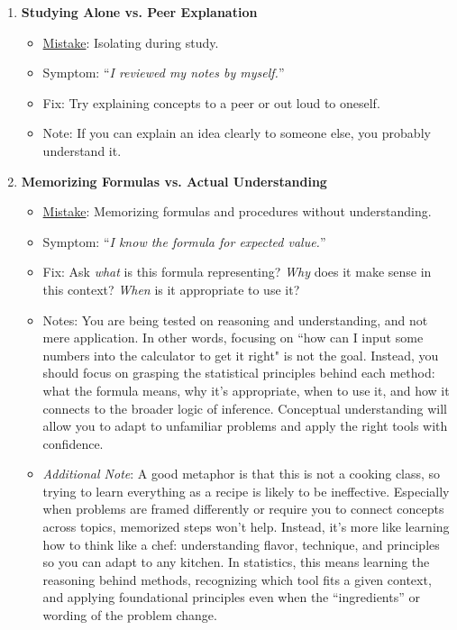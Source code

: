 \documentclass[12pt]{article}
\begin{document}
\begin{enumerate}
\item \textbf{Studying Alone vs. Peer Explanation}
\begin{itemize}
    \item \underline{Mistake}: Isolating during study.
    \item Symptom: ``\emph{I reviewed my notes by myself.}''
    \item Fix: Try explaining concepts to a peer or out loud to oneself.
    \item Note: If you can explain an idea clearly to someone else, you probably understand it.
\end{itemize}

\item \textbf{Memorizing Formulas vs. Actual Understanding}
\begin{itemize}
    \item \underline{Mistake}: Memorizing formulas and procedures without understanding.
    \item Symptom: ``\emph{I know the formula for expected value.}''
    \item Fix: Ask \emph{what} is this formula representing? \emph{Why} does it make sense in this context? \emph{When} is it appropriate to use it?
    \item Notes: You are being tested on reasoning and understanding, and not mere application. In other words, focusing on ``how can I input some numbers into the calculator to get it right" is not the goal. Instead, you should focus on grasping the statistical principles behind each method: what the formula means, why it’s appropriate, when to use it, and how it connects to the broader logic of inference. Conceptual understanding will allow you to adapt to unfamiliar problems and apply the right tools with confidence.
    \item \emph{Additional Note}: A good metaphor is that this is not a cooking class, so trying to learn everything as a recipe is likely to be ineffective. Especially when problems are framed differently or require you to connect concepts across topics, memorized steps won’t help. Instead, it's more like learning how to think like a chef: understanding flavor, technique, and principles so you can adapt to any kitchen. In statistics, this means learning the reasoning behind methods, recognizing which tool fits a given context, and applying foundational principles even when the ``ingredients'' or wording of the problem change.
\end{itemize}


\end{enumerate}
\end{document}
